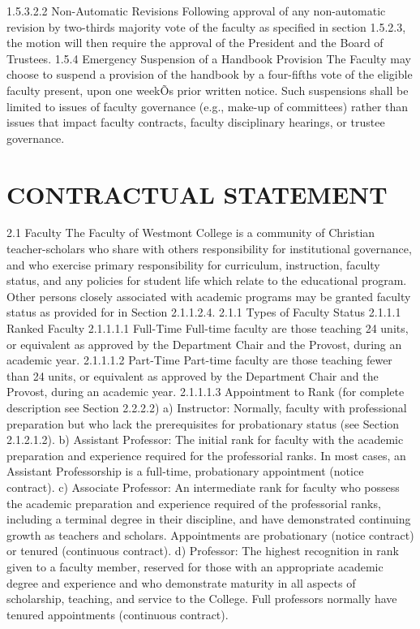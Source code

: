 \documentclass[letterpaper, 11pt]{article}
\begin{document}
			1.5.3.2.2 Non-Automatic Revisions
			Following approval of any non-automatic revision by two-thirds majority vote of the faculty as specified in section 1.5.2.3, the motion will then require the approval of the President and the Board of Trustees.
			1.5.4 Emergency Suspension of a Handbook Provision
			The Faculty may choose to suspend a provision of the handbook by a four-fifths vote of the eligible faculty present, upon one weekÕs prior written notice.  Such suspensions shall be limited to issues of faculty governance (e.g., make-up of committees) rather than issues that impact faculty contracts, faculty disciplinary hearings, or trustee governance.

\section{CONTRACTUAL STATEMENT}
	\label{sec:ContractualStatement}
	2.1 Faculty
	The Faculty of Westmont College is a community of Christian teacher-scholars who share with others responsibility for institutional governance, and who exercise primary responsibility for curriculum, instruction, faculty status, and any policies for student life which relate to the educational program.  Other persons closely associated with academic programs may be granted faculty status as provided for in Section 2.1.1.2.4.
	2.1.1 Types of Faculty Status
	2.1.1.1 Ranked Faculty
	2.1.1.1.1 Full-Time
	Full-time faculty are those teaching 24 units, or equivalent as approved by the Department Chair and the Provost, during an academic year.
	2.1.1.1.2 Part-Time
	Part-time faculty are those teaching fewer than 24 units, or equivalent as approved by the Department Chair and the Provost, during an academic year.
	2.1.1.1.3 Appointment to Rank
	(for complete description see Section 2.2.2.2)
	a) Instructor:  Normally, faculty with professional preparation but who lack the prerequisites for probationary status (see Section 2.1.2.1.2).
	b) Assistant Professor:  The initial rank for faculty with the academic preparation and experience required for the professorial ranks. In most cases, an Assistant Professorship is a full-time, probationary appointment (notice contract).
	c) Associate Professor:  An intermediate rank for faculty who possess the academic preparation and experience required of the professorial ranks, including a terminal degree in their discipline, and have demonstrated continuing growth as teachers and scholars. Appointments are probationary (notice contract) or tenured (continuous contract).
	d) Professor:  The highest recognition in rank given to a faculty member, reserved for those with an appropriate academic degree and experience and who demonstrate maturity in all aspects of scholarship, teaching, and service to the College. Full professors normally have tenured appointments (continuous contract).
\end{document}
